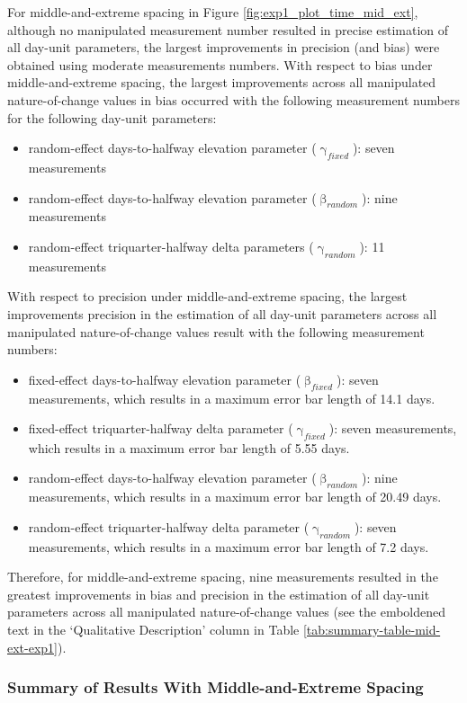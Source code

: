 \documentclass[
12pt, %
twoside,
english]{guelphthesis}
\begin{document}
For middle-and-extreme spacing in Figure \ref{fig:exp1_plot_time_mid_ext}, although no manipulated measurement number resulted in precise estimation of all day-unit parameters, the largest improvements in precision (and bias) were obtained using moderate measurements numbers. With respect to bias under middle-and-extreme spacing, the largest improvements across all manipulated nature-of-change values in bias occurred with the following measurement numbers for the following day-unit parameters:
\begin{itemize}
\tightlist
\item
  random-effect days-to-halfway elevation parameter (\(\upgamma_{fixed}\)): seven measurements
\item
  random-effect days-to-halfway elevation parameter (\(\upbeta_{random}\)): nine measurements
\item
  random-effect triquarter-halfway delta parameters (\(\upgamma_{random}\)): 11 measurements
\end{itemize}
\noindent With respect to precision under middle-and-extreme spacing, the largest improvements precision in the estimation of all day-unit parameters across all manipulated nature-of-change values result with the following measurement numbers:
\begin{itemize}
\tightlist
\item
  fixed-effect days-to-halfway elevation parameter (\(\upbeta_{fixed}\)): seven measurements, which results in a maximum error bar length of 14.1 days.
\item
  fixed-effect triquarter-halfway delta parameter (\(\upgamma_{fixed}\)): seven measurements, which results in a maximum error bar length of 5.55 days.
\item
  random-effect days-to-halfway elevation parameter (\(\upbeta_{random}\)): nine measurements, which results in a maximum error bar length of 20.49 days.
\item
  random-effect triquarter-halfway delta parameter (\(\upgamma_{random}\)): seven measurements, which results in a maximum error bar length of 7.2 days.
\end{itemize}
\noindent Therefore, for middle-and-extreme spacing, nine measurements resulted in the greatest improvements in bias and precision in the estimation of all day-unit parameters across all manipulated nature-of-change values (see the emboldened text in the `Qualitative Description' column in Table \ref{tab:summary-table-mid-ext-exp1}).

\hypertarget{summary-of-results-with-middle-and-extreme-spacing}{%
\subsubsection{Summary of Results With Middle-and-Extreme Spacing}\label{summary-of-results-with-middle-and-extreme-spacing}}
\end{document}

